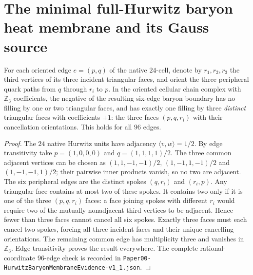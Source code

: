 \documentclass[12pt,a4paper]{article}
\begin{document}
\section{The minimal full-Hurwitz baryon heat membrane and its Gauss source}
\label{p10:sec:v378-baryon-heat-membrane}

\begin{theorem}
\label{p10:thm:v378-unique-baryon-triality-membrane}
For each oriented edge $e=(p,q)$ of the native $24$-cell, denote by
$r_1,r_2,r_3$ the third vertices of its three incident triangular
faces, and orient the three peripheral quark paths from $q$ through
$r_i$ to $p$.  In the oriented cellular chain complex with $\mathbb Z_3$
coefficients, the negative of the resulting six-edge baryon boundary
has no filling by one or two triangular faces, and has exactly one
filling by three \emph{distinct} triangular faces with coefficients
$\pm1$: the three faces $(p,q,r_i)$ with their cancellation
orientations. This holds for all $96$ edges.
\end{theorem}
\begin{proof}
The $24$ native Hurwitz units have adjacency $\langle v,w\rangle=1/2$.
By edge transitivity take $p=(1,0,0,0)$ and
$q=(1,1,1,1)/2$.  The three common adjacent vertices can be chosen
as $(1,1,-1,-1)/2$, $(1,-1,1,-1)/2$ and
$(1,-1,-1,1)/2$; their pairwise inner products vanish, so no two
are adjacent. The six peripheral edges are the distinct spokes
$(q,r_i)$ and $(r_i,p)$.  Any triangular face contains at most two
of these spokes. It contains two only if it is one of the three
$(p,q,r_i)$ faces: a face joining spokes with different $r_i$
would require two of the mutually nonadjacent third vertices to be
adjacent. Hence fewer than three faces cannot cancel all six spokes.
Exactly three faces must each cancel two spokes, forcing all three
incident faces and their unique cancelling orientations. The
remaining common edge has multiplicity three and vanishes in
$\mathbb Z_3$. Edge transitivity proves the result everywhere.
The complete rational-coordinate $96$-edge check is recorded in
\texttt{Paper00-HurwitzBaryonMembraneEvidence-v1\_1.json}.
\end{proof}
\end{document}
